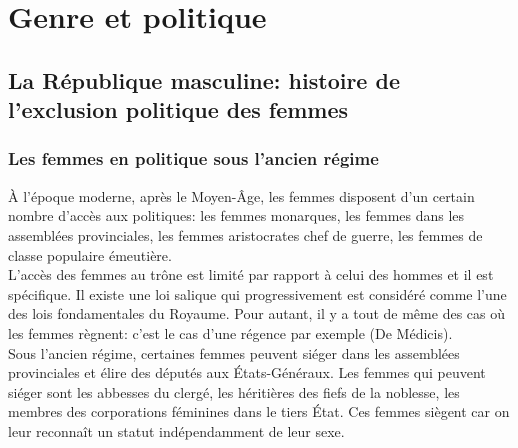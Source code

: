 \documentclass[12pt, a4paper, openany]{book}
\begin{document}
\chapter{Genre et politique}

\section{La République masculine: histoire de l'exclusion politique des femmes}

\subsection{Les femmes en politique sous l'ancien régime}

À l'époque moderne, après le Moyen-Âge, les femmes disposent d'un certain nombre d'accès aux politiques: les femmes monarques, les femmes dans les assemblées provinciales, les femmes aristocrates chef de guerre, les femmes de classe populaire émeutière. \\
L'accès des femmes au trône est limité par rapport à celui des hommes et il est spécifique. Il existe une loi salique qui progressivement est considéré comme l'une des lois fondamentales du Royaume. Pour autant, il y a tout de même des cas où les femmes règnent: c'est le cas d'une régence par exemple (De Médicis). \\
Sous l'ancien régime, certaines femmes peuvent siéger dans les assemblées provinciales et élire des députés aux États-Généraux. Les femmes qui peuvent siéger sont les abbesses du clergé, les héritières des fiefs de la noblesse, les membres des corporations féminines dans le tiers État. Ces femmes siègent car on leur reconnaît un statut indépendamment de leur sexe.
\end{document}
